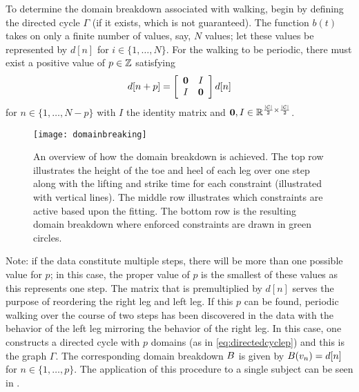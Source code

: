 To determine the domain breakdown associated with walking, begin by defining the
directed cycle $\Gamma$ (if it exists, which is not guaranteed).
%
The function $b(t)$ takes on only a finite number of values, say, $N$ values;
%
let these values be represented by $d[n]$ for $i \in \{1, \ldots, N\}$.
%
For the walking to be periodic, there must exist a positive value of $p \in \mathbb{Z}$
satisfying
\begin{align}
  \label{eq:dstep}
  d[n + p] =
  \left[\begin{array}{c c}
      {\mathbf 0} & I\\
      I & {\mathbf 0}
    \end{array}\right] d[n]
\end{align}
for $n \in \{1, \ldots, N-p\}$ with $I$ the identity matrix and ${\mathbf 0}, I
\in \mathbb{R}^{\frac{|\mathcal{C}|}{2} \times \frac{|\mathcal{C}|}{2}}$.
%
\begin{figure}[t!]
  \centering
  \texttt{[image: domainbreaking]}
  \caption[An overview of how the domain breakdown is achieved.]{An overview of
    how the domain breakdown is achieved.
    The top row illustrates the height of the toe and heel of each leg over one
    step along with the lifting and strike time for each constraint (illustrated
    with vertical lines).
    The middle row illustrates which constraints are active based upon the
    fitting.
    The bottom row is the resulting domain breakdown where enforced constraints
    are drawn in green circles.}
  \label{fig:domainbreakdown}
\end{figure}
Note: if the data constitute multiple steps, there will be more than one
possible value for $p$;
%
in this case, the proper value of $p$ is the smallest of these values as this
represents one step.
%
The matrix that is premultiplied by $d[n]$ serves the purpose of reordering the
right leg and left leg.
%
If this $p$ can be found, periodic walking over the course of two steps has been
discovered in the data with the behavior of the left leg mirroring the behavior
of the right leg.
%
In this case, one constructs a directed cycle with $p$ domains (as in
\eqref{eq:directedcyclep}) and this is the graph $\Gamma$.
%
The corresponding domain breakdown $B$ is given by $B(v_{n}) = d[n]$ for $n
\in \{1, \ldots, p\}$.
%
The application of this procedure to a single subject can be seen in
.

